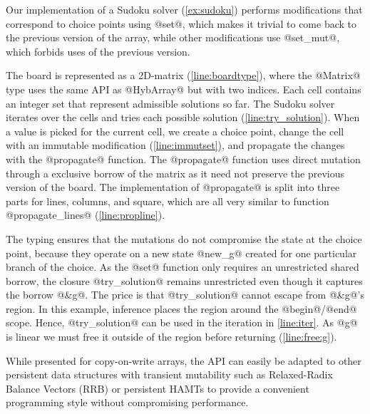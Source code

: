 Our implementation of a Sudoku solver (\cref{ex:sudoku}) performs
modifications that correspond to choice points using @set@,
which makes it trivial to come back to the previous version
of the array, while other modifications use @set_mut@, which
forbids uses of the previous version.

The board is represented as a 2D-matrix (\cref{line:boardtype}), where
the @Matrix@ type uses the same API as @HybArray@
but with two indices.
Each cell contains an integer set that represent admissible solutions so far.
The Sudoku solver iterates over the cells and tries each possible solution (\cref{line:try_solution}).
When a value is picked for the current cell, we create a choice point,
change the cell with an immutable modification (\cref{line:immutset}), and propagate
the changes with the @propagate@ function.
The @propagate@ function uses direct mutation through a
exclusive borrow of the matrix as it need not preserve the previous
version of the board.
The implementation of @propagate@ is split into three parts
for lines, columns, and square, which are all very similar to function
@propagate_lines@ (\cref{line:propline}).

The typing ensures that the mutations do not compromise the state at
the choice point, because they operate on a new state @new_g@ created for one
particular branch of the choice.
As the @set@ function only requires an unrestricted shared borrow,
the closure @try_solution@ remains unrestricted even though
it captures the borrow @&g@. 
The price is that @try_solution@ cannot escape from
@&g@'s region. In this example, inference places the region
around the @begin@/@end@ scope.
Hence, @try_solution@ can be used in
the iteration in \cref{line:iter}.
As @g@ is linear we must free it outside of the region
before returning (\cref{line:free:g}). 

While presented for copy-on-write arrays, the API
can easily be adapted to other persistent data structures with
transient mutability such as Relaxed-Radix Balance Vectors (RRB) \cite{DBLP:journals/pacmpl/Puente17}
or persistent HAMTs \cite{bagwell2001ideal,clojurehamt} to provide  a
convenient programming style without compromising performance.


